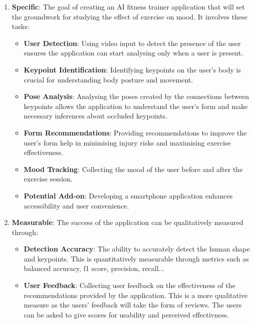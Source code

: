     \begin{enumerate}
        \item \textbf{Specific}: The goal of creating an AI fitness trainer application that will set the groundwork for studying the effect of exercise on mood. It involves these tasks:
        \begin{itemize}
            \item \textbf{User Detection}: Using video input to detect the presence of the user ensures the application can start analysing only when a user is present.
            \item \textbf{Keypoint Identification}: Identifying keypoints on the user's body is crucial for understanding body posture and movement.
            \item \textbf{Pose Analysis}: Analysing the poses created by the connections between keypoints allows the application to understand the user's form and make necessary inferences about occluded keypoints.
            \item \textbf{Form Recommendations}: Providing recommendations to improve the user's form help in minimising injury risks and maximising exercise effectiveness.
            \item \textbf{Mood Tracking}: Collecting the mood of the user before and after the exercise session.
            \item \textbf{Potential Add-on}: Developing a smartphone application enhances accessibility and user convenience.
        \end{itemize}
        
        \item \textbf{Measurable}: The success of the application can be qualitatively measured through:
        \begin{itemize}
            \item \textbf{Detection Accuracy}: The ability to accurately detect the human shape and keypoints. This is quantitatively measurable through metrics such as balanced accuracy, f1 score, precision, recall...
            \item \textbf{User Feedback}: Collecting user feedback on the effectiveness of the recommendations provided by the application. This is a more qualitative measure as the users' feedback will take the form of reviews. The users can be asked to give scores for usability and perceived effectivness.
        \end{itemize}
        

\end{enumerate}
